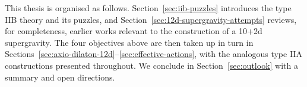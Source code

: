 This thesis is organised as follows. Section~\ref{sec:iib-puzzles} introduces the type IIB theory and its puzzles, and Section~\ref{sec:12d-supergravity-attempts} reviews, for completeness, earlier works relevant to the construction of a 10+2d supergravity. 
The four objectives above are then taken up in turn in Sections~\ref{sec:axio-dilaton-12d}--\ref{sec:effective-actions}, with the analogous type IIA constructions presented throughout. We conclude in Section~\ref{sec:outlook} with a summary and open directions.
